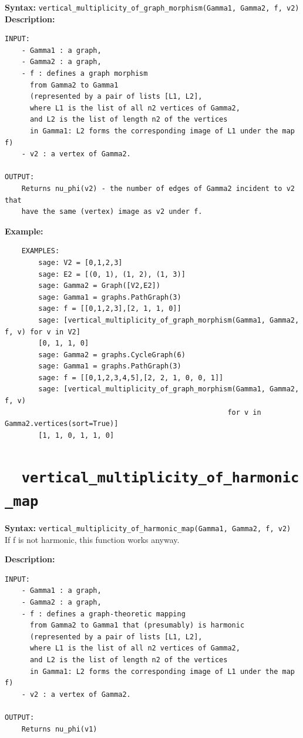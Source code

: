 \documentclass{article}
\begin{document}
\textbf{Syntax:} \verb}vertical_multiplicity_of_graph_morphism(Gamma1, Gamma2, f, v2)}\\

\textbf{Description:}
\begin{verbatim}
INPUT:
    - Gamma1 : a graph, 
    - Gamma2 : a graph, 
    - f : defines a graph morphism
      from Gamma2 to Gamma1 
      (represented by a pair of lists [L1, L2],
      where L1 is the list of all n2 vertices of Gamma2,
      and L2 is the list of length n2 of the vertices
      in Gamma1: L2 forms the corresponding image of L1 under the map f)
    - v2 : a vertex of Gamma2.

OUTPUT:
    Returns nu_phi(v2) - the number of edges of Gamma2 incident to v2 that
    have the same (vertex) image as v2 under f.
\end{verbatim}

\textbf{Example:}
\begin{verbatim}
    EXAMPLES:
        sage: V2 = [0,1,2,3]
        sage: E2 = [(0, 1), (1, 2), (1, 3)]
        sage: Gamma2 = Graph([V2,E2])
        sage: Gamma1 = graphs.PathGraph(3)
        sage: f = [[0,1,2,3],[2, 1, 1, 0]]
        sage: [vertical_multiplicity_of_graph_morphism(Gamma1, Gamma2, f, v) for v in V2]
        [0, 1, 1, 0]
        sage: Gamma2 = graphs.CycleGraph(6)
        sage: Gamma1 = graphs.PathGraph(3)
        sage: f = [[0,1,2,3,4,5],[2, 2, 1, 0, 0, 1]]
        sage: [vertical_multiplicity_of_graph_morphism(Gamma1, Gamma2, f, v) 
                                                     for v in Gamma2.vertices(sort=True)]
        [1, 1, 0, 1, 1, 0]
\end{verbatim}

\section{\tt \ \ vertical\_multiplicity\_of\_harmonic\_map}

\textbf{Syntax:} \verb}vertical_multiplicity_of_harmonic_map(Gamma1, Gamma2, f, v2)}\\

If f is not harmonic, this function works anyway.

\textbf{Description:}
\begin{verbatim}
INPUT:
    - Gamma1 : a graph, 
    - Gamma2 : a graph, 
    - f : defines a graph-theoretic mapping
      from Gamma2 to Gamma1 that (presumably) is harmonic
      (represented by a pair of lists [L1, L2],
      where L1 is the list of all n2 vertices of Gamma2,
      and L2 is the list of length n2 of the vertices
      in Gamma1: L2 forms the corresponding image of L1 under the map f)
    - v2 : a vertex of Gamma2.
    
OUTPUT:
    Returns nu_phi(v1)
\end{verbatim}
\end{document}
